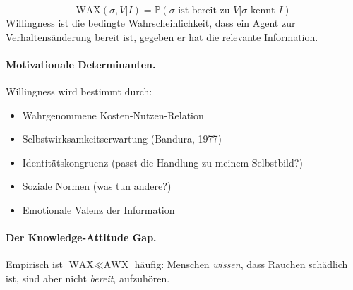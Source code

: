 \begin{axiom}
\begin{equation}
\text{WAX}(\sigma, V | I) = \mathbb{P}(\sigma \text{ ist bereit zu } V | \sigma \text{ kennt } I)
\end{equation}
Willingness ist die bedingte Wahrscheinlichkeit, dass ein Agent zur Verhaltensänderung bereit ist, gegeben er hat die relevante Information.

\paragraph{Motivationale Determinanten.}
Willingness wird bestimmt durch:
\begin{itemize}
    \item Wahrgenommene Kosten-Nutzen-Relation
    \item Selbstwirksamkeitserwartung (Bandura, 1977)
    \item Identitätskongruenz (passt die Handlung zu meinem Selbstbild?)
    \item Soziale Normen (was tun andere?)
    \item Emotionale Valenz der Information
\end{itemize}

\paragraph{Der Knowledge-Attitude Gap.}
Empirisch ist $\text{WAX} \ll \text{AWX}$ häufig: Menschen \textit{wissen}, dass Rauchen schädlich ist, sind aber nicht \textit{bereit}, aufzuhören.
\end{axiom}

